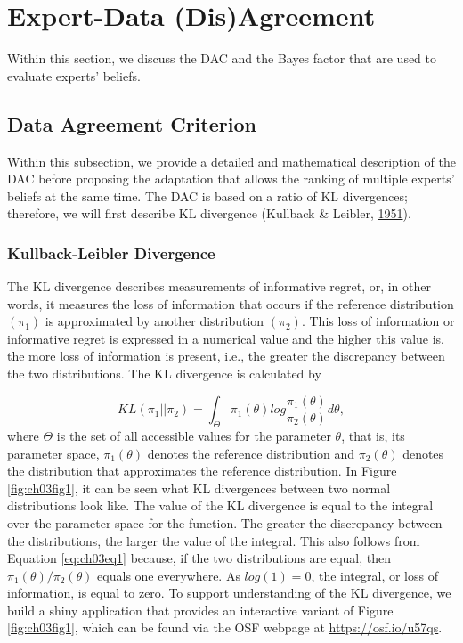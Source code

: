\documentclass[openright,titlepage,12pt,a4paper]{book}
\begin{document}
\hypertarget{expert-data-disagreement}{%
\section{Expert-Data (Dis)Agreement}\label{expert-data-disagreement}}

Within this section, we discuss the DAC and the Bayes factor that are used to evaluate experts' beliefs.

\hypertarget{data-agreement-criterion}{%
\subsection{Data Agreement Criterion}\label{data-agreement-criterion}}

Within this subsection, we provide a detailed and mathematical description of the DAC before proposing the adaptation that allows the ranking of multiple experts' beliefs at the same time. The DAC is based on a ratio of KL divergences; therefore, we will first describe KL divergence (Kullback \& Leibler, \protect\hyperlink{ref-kullback_information_1951}{1951}).

\hypertarget{kullback-leibler-divergence}{%
\subsubsection{Kullback-Leibler Divergence}\label{kullback-leibler-divergence}}

The KL divergence describes measurements of informative regret, or, in other words, it measures the loss of information that occurs if the reference distribution \((\pi_1)\) is approximated by another distribution \((\pi_2)\). This loss of information or informative regret is expressed in a numerical value and the higher this value is, the more loss of information is present, i.e., the greater the discrepancy between the two distributions. The KL divergence is calculated by

\begin{equation} 
KL(\pi_1 || \pi_2) = \int_{\Theta} \pi_1(\theta) log \frac{\pi_1(\theta)}{\pi_2(\theta)} d\theta,
\label{eq:ch03eq1}
\end{equation}
where \(\Theta\) is the set of all accessible values for the parameter \(\theta\), that is, its parameter space, \(\pi_1(\theta)\) denotes the reference distribution and \(\pi_2(\theta)\) denotes the distribution that approximates the reference distribution. In Figure \ref{fig:ch03fig1}, it can be seen what KL divergences between two normal distributions look like. The value of the KL divergence is equal to the integral over the parameter space for the function. The greater the discrepancy between the distributions, the larger the value of the integral. This also follows from Equation \eqref{eq:ch03eq1} because, if the two distributions are equal, then \(\pi_1(\theta)/\pi_2(\theta)\) equals one everywhere. As \(log(1) = 0\), the integral, or loss of information, is equal to zero. To support understanding of the KL divergence, we build a shiny application that provides an interactive variant of Figure \ref{fig:ch03fig1}, which can be found via the OSF webpage at \url{https://osf.io/u57qs}.
\end{document}
